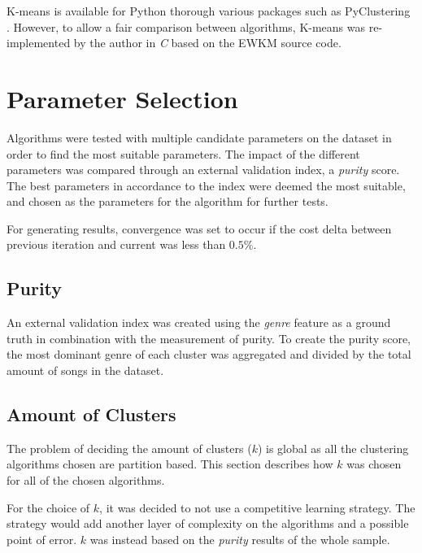 \documentclass[../report.tex]{subfiles}
\begin{document}
K-means is available for Python thorough various packages such as PyClustering \cite{Novikov2019}. However, to allow a fair comparison between algorithms, K-means was re-implemented by the author in \textit{C} based on the EWKM source code.

\section{Parameter Selection}
Algorithms were tested with multiple candidate parameters on the dataset in order to find the most suitable parameters. The impact of the different parameters was compared through an external validation index, a \textit{purity} score. The best parameters in accordance to the index were deemed the most suitable, and chosen as the parameters for the algorithm for further tests.

For generating results, convergence was set to occur if the cost delta between previous iteration and current was less than $0.5\%$.

\subsection{Purity}
An external validation index was created using the \textit{genre} feature as a ground truth in combination with the measurement of purity. To create the purity score, the most dominant genre of each cluster was aggregated and divided by the total amount of songs in the dataset.

\subsection{Amount of Clusters}
The problem of deciding the amount of clusters ($k$) is global as all the clustering algorithms chosen are partition based. This section describes how $k$ was chosen for all of the chosen algorithms.

For the choice of $k$, it was decided to not use a competitive learning strategy. The strategy would add another layer of complexity on the algorithms and a possible point of error. $k$ was instead based on the \textit{purity} results of the whole sample.

\end{document}
